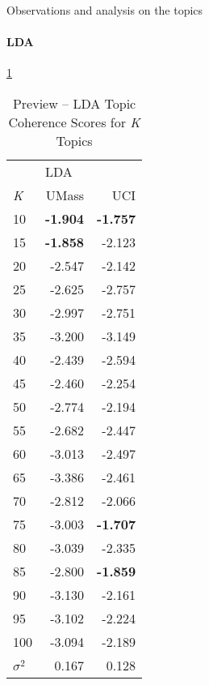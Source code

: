 \documentclass[letterpaper,12pt]{article}
\begin{document}
Observations and analysis on the topics

\paragraph{LDA}

\ref{tab:lda_preview_tc}
\begin{table}
	\caption{\label{tab:lda_preview_tc} Preview -- LDA Topic Coherence Scores for \emph{K} Topics}
	\begin{center}
		\begin{tabular}{lrr}
			\toprule
			{} & \multicolumn{2}{l}{LDA} \\
			\emph{K} &  UMass &    UCI \\
			\midrule
			10  & \textbf{-1.904} & \textbf{-1.757} \\
			15  & \textbf{-1.858} & -2.123 \\
			20  & -2.547 & -2.142 \\
			25  & -2.625 & -2.757 \\
			30  & -2.997 & -2.751 \\
			35  & -3.200 & -3.149 \\
			40  & -2.439 & -2.594 \\
			45  & -2.460 & -2.254 \\
			50  & -2.774 & -2.194 \\
			55  & -2.682 & -2.447 \\
			60  & -3.013 & -2.497 \\
			65  & -3.386 & -2.461 \\
			70  & -2.812 & -2.066 \\
			75  & -3.003 & \textbf{-1.707} \\
			80  & -3.039 & -2.335 \\
			85  & -2.800 & \textbf{-1.859} \\
			90  & -3.130 & -2.161 \\
			95  & -3.102 & -2.224 \\
			100 & -3.094 & -2.189 \\
			\midrule
			$\sigma^2$ & 0.167 & 0.128 \\
			\bottomrule
			\end{tabular}
	\end{center}
\end{table}
\end{document}
